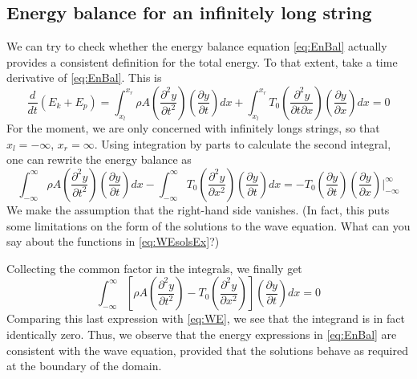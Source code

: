 \subsection{Energy balance for an infinitely long string}



We can try to check whether the energy balance equation \eqref{eq:EnBal} actually provides a consistent definition for the total energy. To that extent, take a time derivative of \eqref{eq:EnBal}. This is
\begin{equation}
\frac{d}{dt}\left( E_k + E_p \right) = \int_{x_l}^{x_r} \rho A \left(\frac{\partial^2 y}{\partial t^2}\right)\left(\frac{\partial y}{\partial t}\right) dx + \int_{x_l}^{x_r} T_0 \left(\frac{\partial^2 y}{\partial t\partial x}\right)\left(\frac{\partial y}{\partial x}\right) dx = 0
\end{equation}
For the moment, we are only concerned with infinitely longs strings, so that $x_l = -\infty$, $x_r = \infty$. Using integration by parts to calculate the second integral, one can rewrite the energy balance as
\begin{equation}
\int_{-\infty}^{\infty} \rho A \left(\frac{\partial^2 y}{\partial t^2}\right)\left(\frac{\partial y}{\partial t}\right) dx - \int_{-\infty}^{\infty} T_0 \left(\frac{\partial^2 y}{\partial x^2}\right)\left(\frac{\partial y}{\partial t}\right) dx = - T_0 \left(\frac{\partial y}{\partial t}\right)\left(\frac{\partial y}{\partial x}\right)\bigg|_{-\infty}^{\infty}
\end{equation}
We make the assumption that the right-hand side vanishes. (In fact, this puts some limitations on the form of the solutions to the wave equation. What can you say about the functions in \eqref{eq:WEsolsEx}?)


Collecting the common factor in the integrals, we finally get
\begin{equation}
\int_{-\infty}^{\infty} \left[ \rho A \left(\frac{\partial^2 y}{\partial t^2}\right) - T_0 \left(\frac{\partial^2 y}{\partial x^2}\right) \right]\left(\frac{\partial y}{\partial t}\right) dx  = 0
\end{equation}
Comparing this last expression with \eqref{eq:WE}, we see that the integrand is in fact identically zero. Thus, we observe that the energy expressions in \eqref{eq:EnBal} are consistent with the wave equation, provided that the solutions behave as required at the boundary of the domain.



